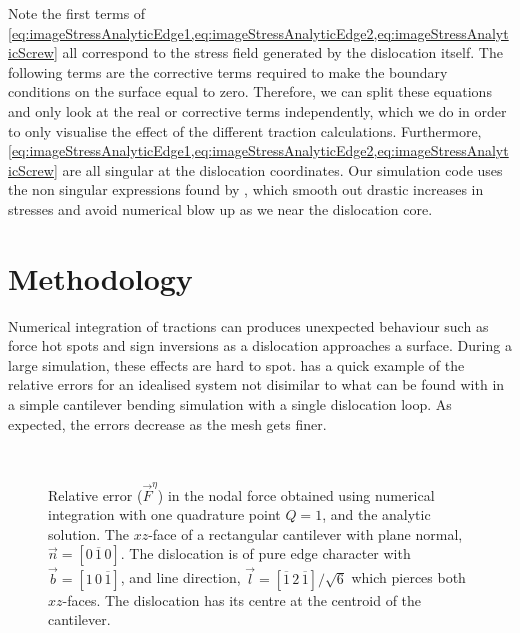 Note the first terms of \cref{eq:imageStressAnalyticEdge1,eq:imageStressAnalyticEdge2,eq:imageStressAnalyticScrew} all correspond to the stress field generated by the dislocation itself. The following terms are the corrective terms required to make the boundary conditions on the surface equal to zero. Therefore, we can split these equations and only look at the real or corrective terms independently, which we do in order to only visualise the effect of the different traction calculations. Furthermore, \cref{eq:imageStressAnalyticEdge1,eq:imageStressAnalyticEdge2,eq:imageStressAnalyticScrew} are all singular at the dislocation coordinates. Our simulation code uses the non singular expressions found by \citet{a_non-singular_continuum_theory_of_dislocations}, which smooth out drastic increases in stresses and avoid numerical blow up as we near the dislocation core.

\section{Methodology}\label{s:paperMethod}

Numerical integration of tractions can produces unexpected behaviour such as force hot spots and sign inversions as a dislocation approaches a surface. During a large simulation, these effects are hard to spot.  has a quick example of the relative errors for an idealised system not disimilar to what can be found with in a simple cantilever bending simulation with a single dislocation loop. As expected, the errors decrease as the mesh gets finer.
\begin{figure}
    \centering
    ~
    \caption[Relative error comparison of analytic vs numeric tractions on a surface as a function of mesh coarseness.]{Relative error ($\vec{F}^{\eta}$) in the nodal force obtained using numerical integration with one quadrature point $Q = 1$, and the analytic solution. The $xz$-face of a rectangular cantilever with plane normal, $\vec{n} = \left[0\,\overline{1}\,0\right]$. The dislocation is of pure edge character with $\vec{b} = [1\,0\,\overline{1}]$, and line direction, $\vec{l} = \left[\overline{1}\,2\,\overline{1}\right]/\sqrt{6}$ which pierces both $xz$-faces. The dislocation has its centre at the centroid of the cantilever.}
    \label{f:err_basic_cantilever}
\end{figure}


